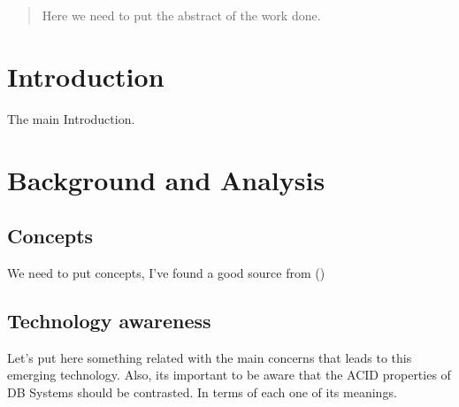 \documentclass[10pt]{article} %
\begin{document}
%



\newpage %

\begin{abstract}

Here we need to put the abstract of the work done.
 
\end{abstract}


\section{Introduction} 

The main Introduction.


\section{Background and Analysis} 
\subsection{Concepts}
We need to put concepts, I've found a good source from ()

\subsection{Technology awareness}
Let's put here something related with the main concerns that leads to this emerging technology. Also, its important to be aware that the ACID properties of DB Systems should be contrasted. In terms of each one of its meanings.
\end{document}
